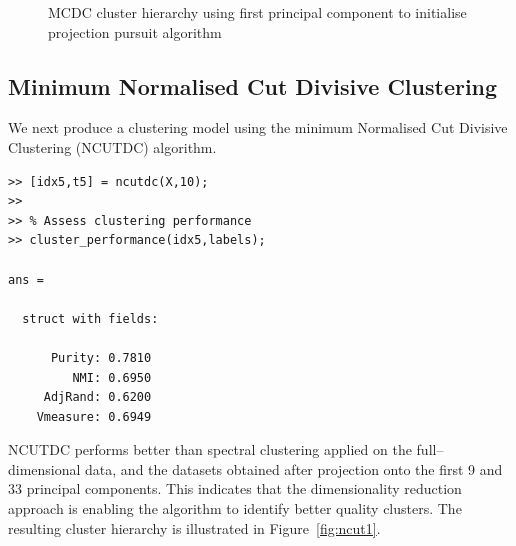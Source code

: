 \documentclass{book}
\begin{document}
\begin{figure}
\begin{htmlonly}
%
\end{htmlonly}
%
\caption{MCDC cluster hierarchy using first principal component to initialise
projection pursuit algorithm}
%
\label{fig:mcdc2}
\end{figure}


\subsection{Minimum Normalised Cut Divisive Clustering}

We next produce a clustering model using the minimum Normalised Cut Divisive Clustering
(NCUTDC) algorithm. 


\begin{lstlisting}
>> [idx5,t5] = ncutdc(X,10);
>> 
>> % Assess clustering performance
>> cluster_performance(idx5,labels);

ans = 

  struct with fields:

      Purity: 0.7810
         NMI: 0.6950
     AdjRand: 0.6200
    Vmeasure: 0.6949

\end{lstlisting}


\noindent
%
NCUTDC performs better than spectral clustering applied on the
full--dimensional data, and the datasets obtained after projection onto the
first 9 and 33 principal components.  This indicates that the dimensionality
reduction approach is enabling the algorithm to identify better quality
clusters. The resulting cluster hierarchy is illustrated in Figure~\ref{fig:ncut1}.
\end{document}
